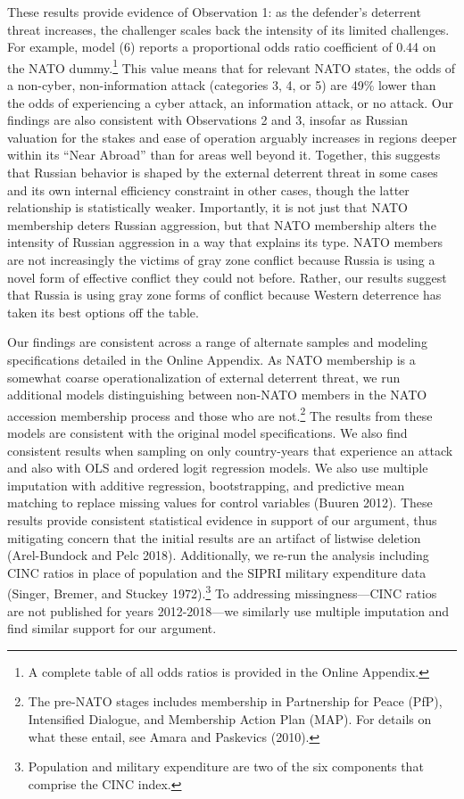 \documentclass[
]{article}
\begin{document}
These results provide evidence of Observation 1: as the defender's deterrent threat increases, the challenger scales back the intensity of its limited challenges. For example, model (6) reports a proportional odds ratio coefficient of 0.44 on the NATO dummy.\footnote{A complete table of all odds ratios is provided in the Online Appendix.} This value means that for relevant NATO states, the odds of a non-cyber, non-information attack (categories 3, 4, or 5) are 49\% lower than the odds of experiencing a cyber attack, an information attack, or no attack. Our findings are also consistent with Observations 2 and 3, insofar as Russian valuation for the stakes and ease of operation arguably increases in regions deeper within its ``Near Abroad'' than for areas well beyond it. Together, this suggests that Russian behavior is shaped by the external deterrent threat in some cases and its own internal efficiency constraint in other cases, though the latter relationship is statistically weaker. Importantly, it is not just that NATO membership deters Russian aggression, but that NATO membership alters the intensity of Russian aggression in a way that explains its type. NATO members are not increasingly the victims of gray zone conflict because Russia is using a novel form of effective conflict they could not before. Rather, our results suggest that Russia is using gray zone forms of conflict because Western deterrence has taken its best options off the table.

Our findings are consistent across a range of alternate samples and modeling specifications detailed in the Online Appendix. As NATO membership is a somewhat coarse operationalization of external deterrent threat, we run additional models distinguishing between non-NATO members in the NATO accession membership process and those who are not.\footnote{The pre-NATO stages includes membership in Partnership for Peace (PfP), Intensified Dialogue, and Membership Action Plan (MAP). For details on what these entail, see Amara and Paskevics (2010).} The results from these models are consistent with the original model specifications. We also find consistent results when sampling on only country-years that experience an attack and also with OLS and ordered logit regression models. We also use multiple imputation with additive regression, bootstrapping, and predictive mean matching to replace missing values for control variables (Buuren 2012). These results provide consistent statistical evidence in support of our argument, thus mitigating concern that the initial results are an artifact of listwise deletion (Arel-Bundock and Pelc 2018). Additionally, we re-run the analysis including CINC ratios in place of population and the SIPRI military expenditure data (Singer, Bremer, and Stuckey 1972).\footnote{Population and military expenditure are two of the six components that comprise the CINC index.} To addressing missingness---CINC ratios are not published for years 2012-2018---we similarly use multiple imputation and find similar support for our argument.
\end{document}
